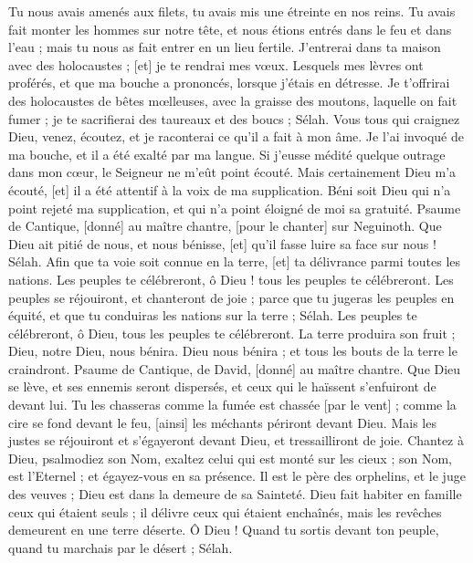 \begin{multicols}{2}
Tu nous avais amenés aux filets, tu avais mis une étreinte en nos reins.
Tu avais fait monter les hommes sur notre tête, et nous étions entrés dans le feu et dans l'eau ; mais tu nous as fait entrer en un lieu fertile.
J'entrerai dans ta maison avec des holocaustes ; [et] je te rendrai mes vœux.
Lesquels mes lèvres ont proférés, et que ma bouche a prononcés, lorsque j'étais en détresse.
Je t'offrirai des holocaustes de bêtes mœlleuses, avec la graisse des moutons, laquelle on fait fumer ; je te sacrifierai des taureaux et des boucs ; Sélah.
Vous tous qui craignez Dieu, venez, écoutez, et je raconterai ce qu'il a fait à mon âme.
Je l'ai invoqué de ma bouche, et il a été exalté par ma langue.
Si j'eusse médité quelque outrage dans mon cœur, le Seigneur ne m'eût point écouté.
Mais certainement Dieu m'a écouté, [et] il a été attentif à la voix de ma supplication.
Béni soit Dieu qui n'a point rejeté ma supplication, et qui n'a point éloigné de moi sa gratuité.
\VerseOne{}Psaume de Cantique, [donné] au maître chantre, [pour le chanter] sur Neguinoth. Que Dieu ait pitié de nous, et nous bénisse, [et] qu'il fasse luire sa face sur nous ! Sélah.
Afin que ta voie soit connue en la terre, [et] ta délivrance parmi toutes les nations.
Les peuples te célébreront, ô Dieu ! tous les peuples te célébreront.
Les peuples se réjouiront, et chanteront de joie ; parce que tu jugeras les peuples en équité, et que tu conduiras les nations sur la terre ; Sélah.
Les peuples te célébreront, ô Dieu, tous les peuples te célébreront.
La terre produira son fruit ; Dieu, notre Dieu, nous bénira.
Dieu nous bénira ; et tous les bouts de la terre le craindront.
\VerseOne{}Psaume de Cantique, de David, [donné] au maître chantre. Que Dieu se lève, et ses ennemis seront dispersés, et ceux qui le haïssent s'enfuiront de devant lui.
Tu les chasseras comme la fumée est chassée [par le vent] ; comme la cire se fond devant le feu, [ainsi] les méchants périront devant Dieu.
Mais les justes se réjouiront et s'égayeront devant Dieu, et tressailliront de joie.
Chantez à Dieu, psalmodiez son Nom, exaltez celui qui est monté sur les cieux ; son Nom, est l'Eternel ; et égayez-vous en sa présence.
Il est le père des orphelins, et le juge des veuves ; Dieu est dans la demeure de sa Sainteté.
Dieu fait habiter en famille ceux qui étaient seuls ; il délivre ceux qui étaient enchaînés, mais les revêches demeurent en une terre déserte.
Ô Dieu ! Quand tu sortis devant ton peuple, quand tu marchais par le désert ; Sélah.

\end{multicols}
